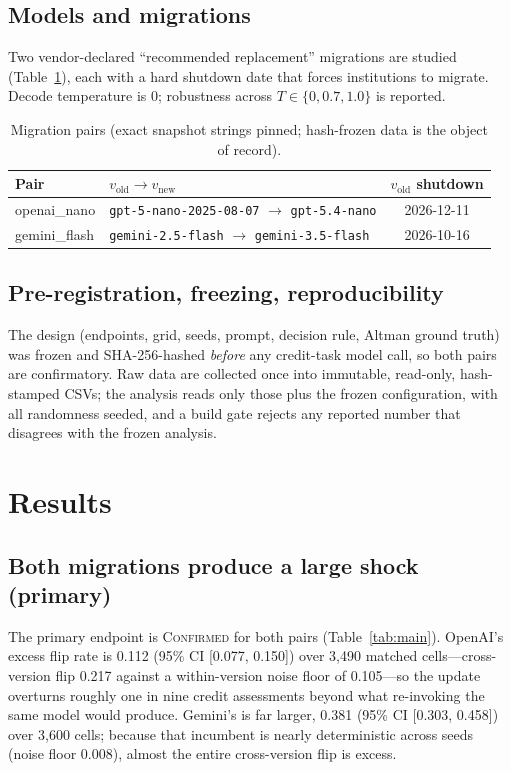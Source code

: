 \documentclass[10pt,twocolumn]{article}
\begin{document}
\subsection{Models and migrations}
Two vendor-declared ``recommended replacement'' migrations are studied (Table~\ref{tab:models}), each with a hard shutdown date that forces institutions to migrate. Decode temperature is 0; robustness across $T\in\{0,0.7,1.0\}$ is reported.

\begin{table}[t]
\centering
\caption{Migration pairs (exact snapshot strings pinned; hash-frozen data is the object of record).}
\label{tab:models}
\small
\begin{tabular}{@{}llc@{}}
\toprule
Pair & $v_{\mathrm{old}}\to v_{\mathrm{new}}$ & $v_{\mathrm{old}}$ shutdown \\
\midrule
openai\_nano & \texttt{gpt-5-nano-2025-08-07} $\to$ \texttt{gpt-5.4-nano} & 2026-12-11 \\
gemini\_flash & \texttt{gemini-2.5-flash} $\to$ \texttt{gemini-3.5-flash} & 2026-10-16 \\
\bottomrule
\end{tabular}
\end{table}

\subsection{Pre-registration, freezing, reproducibility}
The design (endpoints, grid, seeds, prompt, decision rule, Altman ground truth) was frozen and SHA-256-hashed \emph{before} any credit-task model call, so both pairs are confirmatory. Raw data are collected once into immutable, read-only, hash-stamped CSVs; the analysis reads only those plus the frozen configuration, with all randomness seeded, and a build gate rejects any reported number that disagrees with the frozen analysis.

\section{Results}
\subsection{Both migrations produce a large shock (primary)}
The primary endpoint is \textsc{Confirmed} for both pairs (Table~\ref{tab:main}). OpenAI's excess flip rate is 0.112 (95\% CI [0.077, 0.150]) over 3{,}490 matched cells---cross-version flip 0.217 against a within-version noise floor of 0.105---so the update overturns roughly one in nine credit assessments beyond what re-invoking the same model would produce. Gemini's is far larger, 0.381 (95\% CI [0.303, 0.458]) over 3{,}600 cells; because that incumbent is nearly deterministic across seeds (noise floor 0.008), almost the entire cross-version flip is excess.
\end{document}
